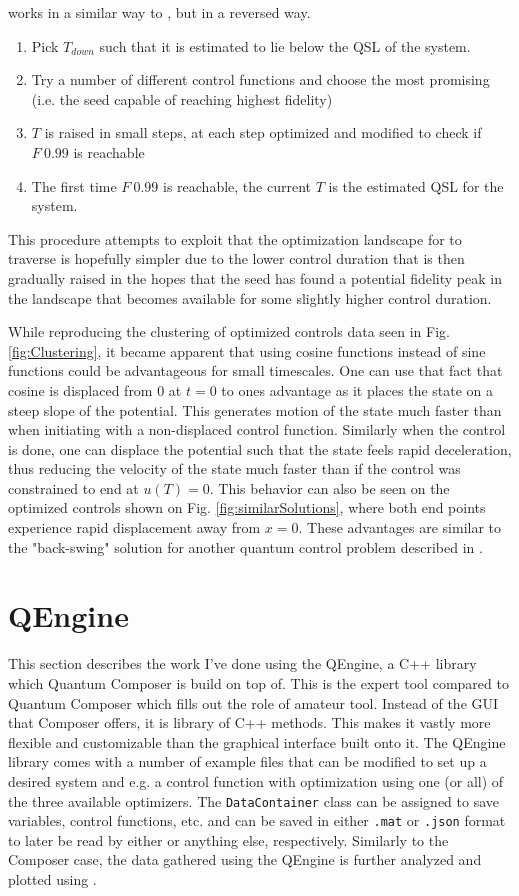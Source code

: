 \documentclass[a4paper, twocolumn]{revtex4-1}
\begin{document}
 works in a similar way to , but in a reversed way.
\begin{enumerate}
	\item Pick $T_{down}$ such that it is estimated to lie below the QSL of the system.
	\item Try a number of different control functions and choose the most promising (i.e. the seed capable of reaching highest fidelity)
	\item $T$ is raised in small steps, at each step optimized and modified to check if $F~0.99$ is reachable
	\item The first time $F~0.99$ is reachable, the current $T$ is the estimated QSL for the system.
\end{enumerate}
This procedure attempts to exploit that the optimization landscape for  to traverse is hopefully simpler due to the lower control duration that is then gradually raised in the hopes that the seed has found a potential fidelity peak in the landscape that becomes available for some slightly higher control duration.

While reproducing the clustering of optimized controls data seen in Fig. \ref{fig:Clustering}, it became apparent that using cosine functions instead of sine functions could be advantageous for small timescales. One can use that fact that cosine is displaced from 0 at $t=0$ to ones advantage as it places the state on a steep slope of the potential. This generates motion of the state much faster than when initiating with a non-displaced control function. Similarly when the control is done, one can displace the potential such that the state feels rapid deceleration, thus reducing the velocity of the state much faster than if the control was constrained to end at $u(T)=0$. This behavior can also be seen on the optimized controls shown on Fig. \ref{fig:similarSolutions}, where both end points experience rapid displacement away from $x=0$. These advantages are similar to the "back-swing" solution for another quantum control problem described in \cite{QM2Paper}.

\section{QEngine}\label{sec:QEngine}
This section describes the work I've done using the QEngine, a C++ library which Quantum Composer is build on top of. This is the expert tool compared to Quantum Composer which fills out the role of amateur tool. Instead of the GUI that Composer offers, it is library of C++ methods. This makes it vastly more flexible and customizable than the graphical interface built onto it. The QEngine library comes with a number of example files that can be modified to set up a desired system and e.g. a control function with optimization using one (or all) of the three available optimizers. The \texttt{DataContainer} class can be assigned to save variables, control functions, etc. and can be saved in either \texttt{.mat} or \texttt{.json} format to later be read by either  or anything else, respectively. Similarly to the Composer case, the data gathered using the QEngine is further analyzed and plotted using . \\
\end{document}
